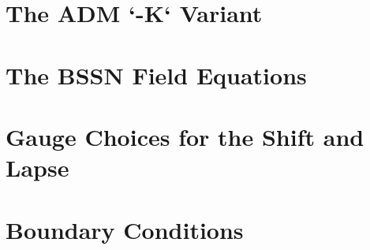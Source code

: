 \section{The ADM `\ggm-K` Variant}\label{S:ADM_gk}

\section{The BSSN Field Equations}\label{S:BSSN}

\section{Gauge Choices for the Shift and Lapse}\label{S:shift_lapse}

\section{Boundary Conditions}\label{S:BCs}
